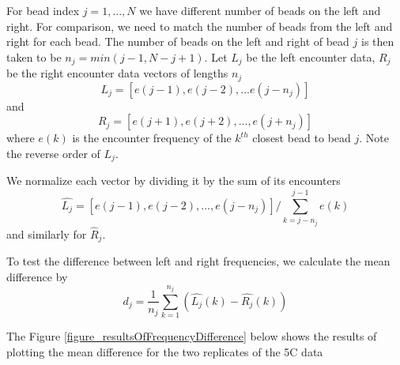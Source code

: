 \documentclass[12pt]{book}
\begin{document}
For bead index $j=1,...,N$ we have different number of beads on the left and right. For comparison, we need to match the number of beads from the left and right for each bead. The number of beads on the left and right of bead $j$ is then taken to be $n_j=min(j-1,N-j+1)$. 
Let $L_j$ be the left encounter data, $R_j$ be the right encounter data vectors of lengths $n_j$
\begin{equation*}
L_j=\left[e(j-1),e(j-2),...e(j-n_j)\right] 
\end{equation*}
and 
\begin{equation*}
R_j=\left[e(j+1), e(j+2),...,e(j+n_j)\right]
\end{equation*}
where $e(k)$ is the encounter frequency of the $k^{th}$ closest bead to bead $j$. Note the reverse order of $L_j$.

We normalize each vector by dividing it by the sum of its encounters
\begin{equation*}
\hat{L_j} =\left[e(j-1),e(j-2),...,e(j-n_j)\right]/\sum_{k=j-n_j}^{j-1}e(k)
\end{equation*}
and similarly for $\hat{R}_j$.

To test the difference between left and right frequencies, we calculate the mean difference by 
\begin{equation*}
d_j=\frac{1}{n_j}\sum_{k=1}^{n_j} \left(\hat{L_j}(k)-\hat{R_j}(k)\right)
\end{equation*}

The Figure \ref{figure_resultsOfFrequencyDifference} below shows the results of plotting the mean difference for the two replicates of the 5C data 
\end{document}
